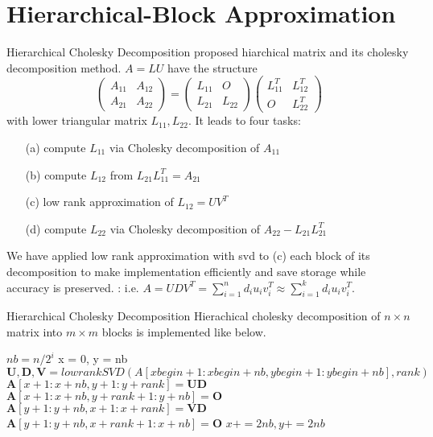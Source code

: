 \section{Hierarchical-Block Approximation}

\begin{frame}{Hierarchical Cholesky Decomposition}
\footnotesize
\citet{hackbusch2015hierarchical} proposed hiarchical matrix and its cholesky decomposition method.
$A=LU$ have the structure
$$\begin{pmatrix}A_{11}&A_{12}\\A_{21}&A_{22}\end{pmatrix}=\begin{pmatrix}L_{11}&O\\L_{21}&L_{22}\end{pmatrix}\begin{pmatrix}L_{11}^T&L_{12}^T\\O&L_{22}^T\end{pmatrix}$$
with lower triangular matrix $L_{11},L_{22}$.
It leads to four tasks:
\begin{itemize}
	\item[(a)] compute $L_{11}$ via Cholesky decomposition of $A_{11}$
	\item[(b)] compute $L_{12}$ from $L_{21}L_{11}^T = A_{21}$
	\item[(c)] low rank approximation of $L_{12}=UV^T$
	\item[(d)] compute $L_{22}$ via Cholesky decomposition of $A_{22}-L_{21}L_{21}^T$
\end{itemize}

We have applied low rank approximation with svd to (c) each block of its decomposition to make implementation efficiently and save storage while accuracy is preserved.
: i.e. $A=UDV^T=\sum_{i=1}^n d_i u_iv_i^T\approx\sum_{i=1}^k d_i u_iv_i^T$.
\end{frame}

\begin{frame}{Hierarchical Cholesky Decomposition}
Hierachical cholesky decomposition of $n\times n$ matrix into $m\times m$ blocks is implemented like below.
\begin{algorithm}[ht]
	\caption{Hierachical cholesky decomposition}
	\begin{algorithmic}[1]
		\tiny
		\State $nb = n/2^i$
		\State x = 0, y = nb
		\State $\mathbf{U,D,V} = lowrankSVD(A[xbegin+1:xbegin+nb,ybegin+1:ybegin+nb], rank)$
		\State $\mathbf{A}[x + 1:x + nb, y + 1:y + rank] = \mathbf{UD}$
		\State $\mathbf{A}[x + 1:x + nb, y + rank+1:y + nb] = \mathbf{O}$
		\State $\mathbf{A}[y + 1:y + nb, x + 1:x + rank] = \mathbf{VD}$
		\State $\mathbf{A}[y + 1:y + nb, x + rank+1:x + nb] = \mathbf{O}$
		\State $x += 2nb, y += 2nb$
		\EndFor
		\EndFor
		\EndProcedure
		
	\end{algorithmic}\label{alg:hchol}
\end{algorithm}
\end{frame}

